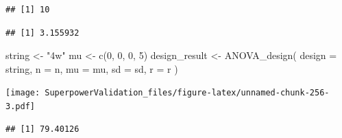 \documentclass[
]{book}
\newenvironment{Shaded}{\begin{snugshade}}{\end{snugshade}}
\newcommand{\AttributeTok}[1]{\textcolor[rgb]{0.77,0.63,0.00}{#1}}
\newcommand{\DecValTok}[1]{\textcolor[rgb]{0.00,0.00,0.81}{#1}}
\newcommand{\FunctionTok}[1]{\textcolor[rgb]{0.00,0.00,0.00}{#1}}
\newcommand{\NormalTok}[1]{#1}
\newcommand{\OtherTok}[1]{\textcolor[rgb]{0.56,0.35,0.01}{#1}}
\newcommand{\SpecialCharTok}[1]{\textcolor[rgb]{0.00,0.00,0.00}{#1}}
\newcommand{\StringTok}[1]{\textcolor[rgb]{0.31,0.60,0.02}{#1}}
\begin{document}
\begin{Shaded}
\end{Shaded}

\begin{verbatim}
## [1] 10
\end{verbatim}

\begin{Shaded}
\end{Shaded}

\begin{verbatim}
## [1] 3.155932
\end{verbatim}

\begin{Shaded}
\begin{Highlighting}[]
\NormalTok{string }\OtherTok{\textless{}{-}} \StringTok{"4w"}
\NormalTok{mu }\OtherTok{\textless{}{-}} \FunctionTok{c}\NormalTok{(}\DecValTok{0}\NormalTok{, }\DecValTok{0}\NormalTok{, }\DecValTok{0}\NormalTok{, }\DecValTok{5}\NormalTok{)}
\NormalTok{design\_result }\OtherTok{\textless{}{-}} \FunctionTok{ANOVA\_design}\NormalTok{(}
  \AttributeTok{design =}\NormalTok{ string,}
  \AttributeTok{n =}\NormalTok{ n,}
  \AttributeTok{mu =}\NormalTok{ mu,}
  \AttributeTok{sd =}\NormalTok{ sd,}
  \AttributeTok{r =}\NormalTok{ r}
\NormalTok{)}
\end{Highlighting}
\end{Shaded}

\texttt{[image: SuperpowerValidation\_files/figure-latex/unnamed-chunk-256-3.pdf]}

\begin{Shaded}
\end{Shaded}

\begin{verbatim}
## [1] 79.40126
\end{verbatim}

\begin{Shaded}
\end{Shaded}
\end{document}
